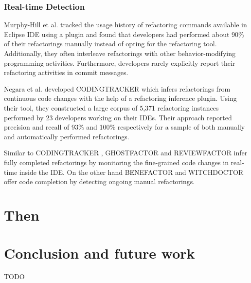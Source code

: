 \documentclass[letterpaper,12pt,onecolumn,final]{report}
\begin{document}
\subsection{Real-time Detection}
Murphy-Hill et al. \cite{MurphyHill2012} tracked the usage history of refactoring commands available in Eclipse IDE using a plugin and found that developers had performed about 90\% of their refactorings manually instead of opting for the refactoring tool. Additionally, they often interleave refactorings with other behavior-modifying programming activities. Furthermore, developers rarely explicitly report their refactoring activities in commit messages.

Negara et al. \cite{Negara2013} developed CODINGTRACKER which infers refactorings from continuous code changes with the help of a refactoring inference plugin. Using their tool, they constructed a large corpus of 5,371 refactoring instances performed by 23 developers working on their IDEs. Their approach reported precision and recall of 93\% and 100\% respectively for a sample of both manually and automatically performed refactorings.

Similar to CODINGTRACKER \cite{Negara2013}, GHOSTFACTOR \cite{Ge2014} and REVIEWFACTOR \cite{Ge2017} infer fully completed refactorings by monitoring the fine-grained code changes in real-time inside the IDE. On the other hand BENEFACTOR \cite{Ge2012} and WITCHDOCTOR \cite{Foster2012} offer code completion by detecting ongoing manual refactorings.


\chapter{Then}


\chapter{Conclusion and future work}
\label{chap:conclusion}

TODO


\clearpage
{}
{}  %
\singlespacing %


\end{document}
